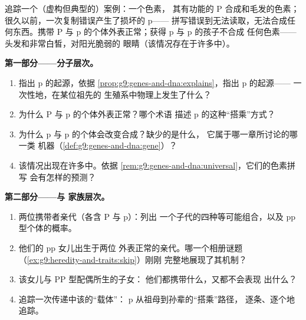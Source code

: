 \begin{problem}\label{pb:g9:genes-and-dna:1}
追踪一个（虚构但典型的）案例：一个色素，
其有功能的 P 合成和毛发的色素；
很久以前，一次复制错误产生了损坏的 p——
拼写错误到无法读取，无法合成任何东西。携带 P
与 p 的个体外表正常；获得 p 与 p 的孩子不合成
任何色素——头发和非常白皙，对阳光脆弱的
眼睛（该情况存在于许多中）。

\medskip\noindent\textbf{第一部分——分子层次。}
\begin{enumerate}
  \item 指出 p 的起源，依据
        \cref{prop:g9:genes-and-dna:explains}，指出 p 的起源——
        一次性地，在某位祖先的
        生殖系中物理上发生了什么？
  \item 为什么 P 与 p 的个体外表正常？哪个术语
        描述 p 的这种“搭乘”方式？
  \item 为什么 p 与 p 的个体会改变合成？缺少的是什么，
        它属于哪一章所讨论的哪一类
        机器（\cref{def:g9:genes-and-dna:gene}）？
  \item 该情况出现在许多中。依据
        \cref{rem:g9:genes-and-dna:universal}，它们的色素拼写
        会有怎样的预测？
\end{enumerate}

\medskip\noindent\textbf{第二部分——与
家族层次。}
\begin{enumerate}[resume]
  \item 两位携带者亲代（各含 P 与 p）：列出
        一个子代的四种等可能组合，以及
        pp 型个体的概率。
  \item 他们的 pp 女儿出生于两位
        外表正常的亲代。哪一个相册谜题
        （\cref{ex:g9:heredity-and-traits:skip}）刚刚
        完整地展现了其机制？
  \item 该女儿与 PP 型配偶所生的子女：
        他们都携带什么，又都不会表现
        出什么？
  \item 追踪一次传递中该的“载体”：
        p 从祖母到孙辈的“搭乘”路径，
        逐条、逐个地追踪。
\end{enumerate}


\end{problem}
